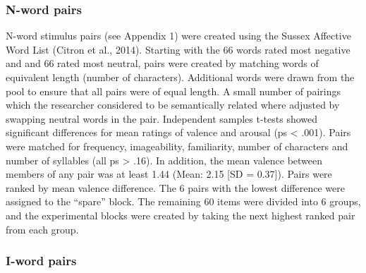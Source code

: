 \documentclass[man,a4paper,biblatex]{apa6}
\begin{document}
\subsubsection{N-word pairs}

N-word stimulus pairs (see Appendix 1) were created using the Sussex
Affective Word List (Citron et al., 2014). Starting with the 66
words rated most negative and and 66 rated most neutral, pairs were
created by matching words of equivalent length (number of characters).
Additional words were drawn from the pool to ensure that all pairs were of
equal length.  A small number of pairings which the researcher considered
to be semantically related where adjusted by swapping neutral words in
the pair.  Independent samples t-tests showed significant differences for
mean ratings of valence and arousal (ps < .001).  Pairs were matched
for frequency, imageability, familiarity, number of characters and
number of syllables (all  ps > .16).  In addition, the mean valence
between members of any pair was at least 1.44  (Mean: 2.15 [SD = 0.37]).
Pairs were ranked by mean valence difference.  The 6 pairs with the
lowest difference were assigned to the “spare” block.  The remaining
60 items were divided into 6 groups, and the experimental blocks were
created by taking the next highest ranked pair from each group.

\subsubsection{I-word pairs}
\end{document}
